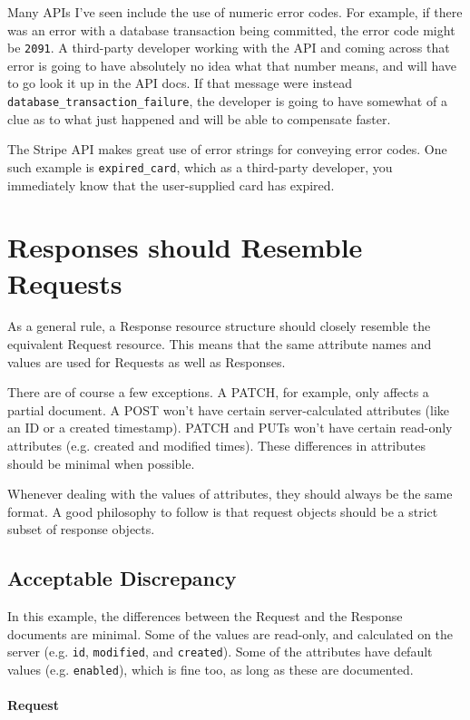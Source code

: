 \documentclass{book}
\begin{document}
Many APIs I've seen include the use of numeric error codes. For example, if there was an error with a database transaction being committed, the error code might be \texttt{2091}. A third-party developer working with the API and coming across that error is going to have absolutely no idea what that number means, and will have to go look it up in the API docs. If that message were instead \texttt{database\_transaction\_failure}, the developer is going to have somewhat of a clue as to what just happened and will be able to compensate faster.

The Stripe API \cite[\#Errors]{STRIPEAPI} makes great use of error strings for conveying error codes. One such example is \texttt{expired\_card}, which as a third-party developer, you immediately know that the user-supplied card has expired.


\section{Responses should Resemble Requests}

As a general rule, a Response resource structure should closely resemble the equivalent Request resource. This means that the same attribute names and values are used for Requests as well as Responses.

There are of course a few exceptions. A PATCH, for example, only affects a partial document. A POST won't have certain server-calculated attributes (like an ID or a created timestamp). PATCH and PUTs won't have certain read-only attributes (e.g. created and modified times). These differences in attributes should be minimal when possible.

Whenever dealing with the values of attributes, they should always be the same format. A good philosophy to follow is that request objects should be a strict subset of response objects.

\subsection{Acceptable Discrepancy}

In this example, the differences between the Request and the Response documents are minimal. Some of the values are read-only, and calculated on the server (e.g. \texttt{id}, \texttt{modified}, and \texttt{created}). Some of the attributes have default values (e.g. \texttt{enabled}), which is fine too, as long as these are documented.

\paragraph{\textbf{Request}}
\end{document}
